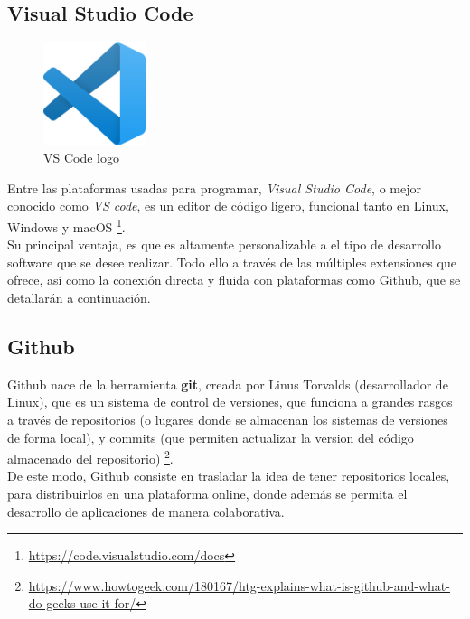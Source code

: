 \subsection{Visual Studio Code}
\label{subsec:visual_studio_code}

\begin{figure} [tp]
	\begin{center}
	\includegraphics[height=3cm]{imagenes/cap3/4_vscode_logo.png}
	\end{center}
	\caption[VS Code logo]{VS Code logo}
	\label{fig:vscode}
\end{figure}

Entre las plataformas usadas para programar, \emph{Visual Studio Code}, o mejor conocido como \emph{VS code}, es un editor de código ligero, funcional tanto en Linux, Windows y macOS \footnote[9]{\url{https://code.visualstudio.com/docs}}.\\

Su principal ventaja, es que es altamente personalizable a el tipo de desarrollo software que se desee realizar. Todo ello a través de las múltiples extensiones que ofrece, así como la conexión directa y fluida con plataformas como Github, que se detallarán a continuación.\\

\subsection{Github}
\label{subsec:github}

Github nace de la herramienta \textbf{git}, creada por Linus Torvalds (desarrollador de Linux), que es un sistema de control de versiones, que funciona a grandes rasgos a través de repositorios (o lugares donde se almacenan los sistemas de versiones de forma local), y commits (que permiten actualizar la version del código almacenado del repositorio) \footnote[10]{\url{https://www.howtogeek.com/180167/htg-explains-what-is-github-and-what-do-geeks-use-it-for/}}.\\

De este modo, Github consiste en trasladar la idea de tener repositorios locales, para distribuirlos en una plataforma online, donde además se permita el desarrollo de aplicaciones de manera colaborativa.\\

